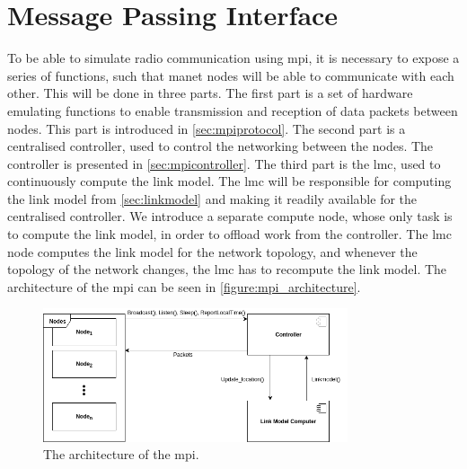 \chapter{Message Passing Interface}
To be able to simulate radio communication using \gls{mpi}, it is necessary to expose a series of functions, such that \gls{manet} nodes will be able to communicate with each other. This will be done in three parts. The first part is a set of hardware emulating functions to enable transmission and reception of data packets between nodes. This part is introduced in \autoref{sec:mpiprotocol}. The second part is a centralised controller, used to control the networking between the nodes. The controller is presented in \autoref{sec:mpicontroller}. The third part is the \acrfull{lmc}, used to continuously compute the link model. The \gls{lmc} will be responsible for computing the link model from \autoref{sec:linkmodel} and making it readily available for the centralised controller. We introduce a separate compute node, whose only task is to compute the link model, in order to offload work from the controller. The \gls{lmc} node computes the link model for the network topology, and whenever the topology of the network changes, the \gls{lmc} has to recompute the link model. \smallbreak
The architecture of the \acrlong{mpi} can be seen in \autoref{figure:mpi_architecture}.

\begin{figure}[ht]
    \centering
    \includegraphics[width=0.8\textwidth]{figures/mpi_architecture.png}
    \caption{The architecture of the \acrlong{mpi}.}
    \label{figure:mpi_architecture}
\end{figure}




%

